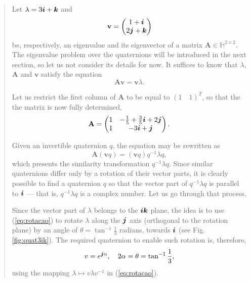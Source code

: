 \vspace{-2em}
\begin{quotation}
\begin{example}
\label{example:01}
\upshape
Let $ \lambda = 3\boldsymbol{i} + \boldsymbol{k} $ and
\begin{equation}
\mathbf{v} =\begin{pmatrix}
1 +  \boldsymbol{i}\\
2 \boldsymbol{j} + \boldsymbol{k}
\end{pmatrix}
\end{equation}
be, respectively, an eigenvalue and its eigenvector of a matrix $\mathbf{A} \in \mathbb{H}^{2 \times 2}$. The eigenvalue problem over the quaternions will be introduced in the next section, so let us not consider its details for now. It suffices to know that $\lambda$, $\mathbf{A}$ and $\mathbf{v}$ satisfy the equation
\begin{equation}
\label{eq:03}
\mathbf{A} \mathbf{v} = \mathbf{v} \lambda.
\end{equation}

Let us restrict the first column of $\mathbf{A}$ to be equal to $ (1 \quad 1)^T $, so that the the matrix is now fully determined,
\begin{equation}
\mathbf{A} =
\begin{pmatrix}
1 & - \frac{1}{5} + \frac{3}{5} \boldsymbol{i} + 2 \boldsymbol{j} \\
1 & -3 \boldsymbol{i} + \boldsymbol{j}
\end{pmatrix}.
\end{equation}

Given an invertible quaternion $q$, the equation may be rewritten as
\begin{equation}
\label{eq:rewritten}
\mathbf{A} (\mathbf{v} q) = (\mathbf{v} q) q^{-1} \lambda q,
\end{equation}
which presents the similarity transformation $q^{-1} \lambda q$. Since similar quaternions differ only by a rotation of their vector parts, it is clearly possible to find a quaternion $q$ so that the vector part of $q^{-1} \lambda q$ is parallel to $\boldsymbol{i}$ --- that is, $q^{-1} \lambda q$ is a complex number. Let us go through that process.

Since the vector part of $\lambda$ belongs to the $ \boldsymbol{i} \boldsymbol{k} $ plane, the idea is to use (\ref{eq:rotacao}) to rotate $\lambda$ along the $\boldsymbol{j}$ axis (orthogonal to the rotation plane) by an angle of $ \theta = \tan^{-1} \frac{1}{3} $ radians, towards $ \boldsymbol{i} $ (see Fig. \ref{fig:quat3ik}). The required quaternion to enable such rotation is, therefore,
\begin{equation}
\label{eq:04}
v = e^{\boldsymbol{j} \alpha}, \quad 2\alpha = \theta = \tan^{-1} \frac{1}{3},
\end{equation}
using the mapping $ \lambda \mapsto v \lambda v^{-1} $ in (\ref{eq:rotacao}).


\end{example}
\end{quotation}
